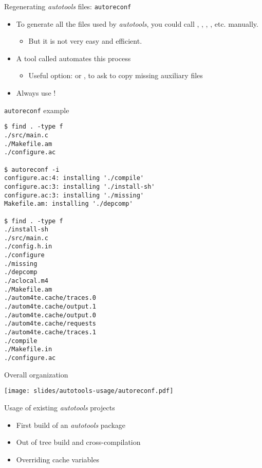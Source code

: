 \begin{frame}{Regenerating {\em autotools} files: {\tt autoreconf}}
  \begin{itemize}
  \item To generate all the files used by {\em autotools}, you could
    call , , ,
    , etc. manually.
    \begin{itemize}
    \item But it is not very easy and efficient.
    \end{itemize}
  \item A tool called  automates this process
    \begin{itemize}
    \item Useful option:  or , to ask
       to copy missing auxiliary files
    \end{itemize}
  \item Always use !
  \end{itemize}
\end{frame}

\begin{frame}[fragile]{{\tt autoreconf} example}

\begin{block}{}
{\tiny
\begin{verbatim}
$ find . -type f
./src/main.c
./Makefile.am
./configure.ac

$ autoreconf -i
configure.ac:4: installing './compile'
configure.ac:3: installing './install-sh'
configure.ac:3: installing './missing'
Makefile.am: installing './depcomp'

$ find . -type f
./install-sh
./src/main.c
./config.h.in
./configure
./missing
./depcomp
./aclocal.m4
./Makefile.am
./autom4te.cache/traces.0
./autom4te.cache/output.1
./autom4te.cache/output.0
./autom4te.cache/requests
./autom4te.cache/traces.1
./compile
./Makefile.in
./configure.ac
\end{verbatim}}
\end{block}

\end{frame}

\begin{frame}{Overall organization}

  \begin{center}
    \texttt{[image: slides/autotools-usage/autoreconf.pdf]}
  \end{center}

\end{frame}

\setuplabframe
{Usage of existing {\em autotools} projects}
{
  \begin{itemize}
  \item First build of an {\em autotools} package
  \item Out of tree build and cross-compilation
  \item Overriding cache variables
  \end{itemize}
}

